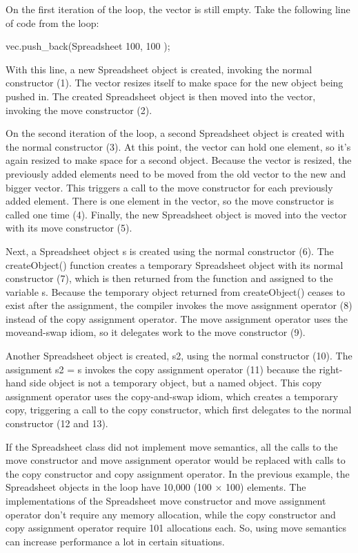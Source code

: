 On the first iteration of the loop, the vector is still empty. Take the following line of code from the loop:

\begin{cpp}
vec.push_back(Spreadsheet { 100, 100 });
\end{cpp}

With this line, a new Spreadsheet object is created, invoking the normal constructor (1). The vector resizes itself to make space for the new object being pushed in. The created Spreadsheet object is then moved into the vector, invoking the move constructor (2).

On the second iteration of the loop, a second Spreadsheet object is created with the normal constructor (3). At this point, the vector can hold one element, so it’s again resized to make space for a second object. Because the vector is resized, the previously added elements need to be moved from the old vector to the new and bigger vector. This triggers a call to the move constructor for each previously added element. There is one element in the vector, so the move constructor is called one time (4). Finally, the new Spreadsheet object is moved into the vector with its move constructor (5).

Next, a Spreadsheet object s is created using the normal constructor (6). The createObject() function creates a temporary Spreadsheet object with its normal constructor (7), which is then returned from the function and assigned to the variable s. Because the temporary object returned from createObject() ceases to exist after the assignment, the compiler invokes the move assignment operator (8) instead of the copy assignment operator. The move assignment operator uses the moveand-swap idiom, so it delegates work to the move constructor (9).

Another Spreadsheet object is created, s2, using the normal constructor (10). The assignment s2 = s invokes the copy assignment operator (11) because the right-hand side object is not a temporary object, but a named object. This copy assignment operator uses the copy-and-swap idiom, which creates a temporary copy, triggering a call to the copy constructor, which first delegates to the normal constructor (12 and 13).

If the Spreadsheet class did not implement move semantics, all the calls to the move constructor and move assignment operator would be replaced with calls to the copy constructor and copy assignment operator. In the previous example, the Spreadsheet objects in the loop have 10,000 (100 × 100) elements. The implementations of the Spreadsheet move constructor and move assignment operator don’t require any memory allocation, while the copy constructor and copy assignment operator require 101 allocations each. So, using move semantics can increase performance a lot in certain situations.

